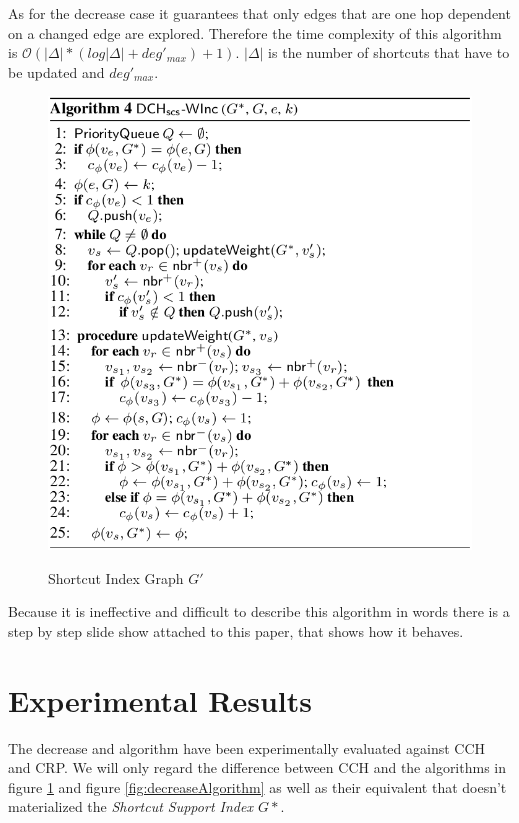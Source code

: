 \documentclass[twocolumn]{article}
\begin{document}
As for the decrease case it guarantees that only edges that are one hop dependent on a changed edge are explored. Therefore the time complexity 
of this algorithm is $\mathcal{O}(\vert\Delta\vert  * (log \vert \Delta \vert + deg'_{max}) + 1)$.  $\vert\Delta\vert$ is the
number of shortcuts that have to be updated and $deg'_{max}$. 

\begin{figure}[ht]
    \caption{Shortcut Index Graph $G'$}
    \centering
    \includegraphics[width=\linewidth]{increaseAlgorithm}
    \label{fig:increaseAlgorithm}
\end{figure}

Because it is ineffective and difficult to describe this algorithm in words there is a step by step slide show attached to this
paper, that shows how it behaves. 

\section{Experimental Results} \label{Experimental Results}

The decrease and algorithm have been experimentally evaluated against CCH and CRP. We will only regard the difference between 
CCH and the algorithms in figure \ref{fig:increaseAlgorithm} and figure \ref{fig:decreaseAlgorithm} as well as their equivalent
that doesn't materialized the \textit{Shortcut Support Index $G*$}. 
\end{document}
